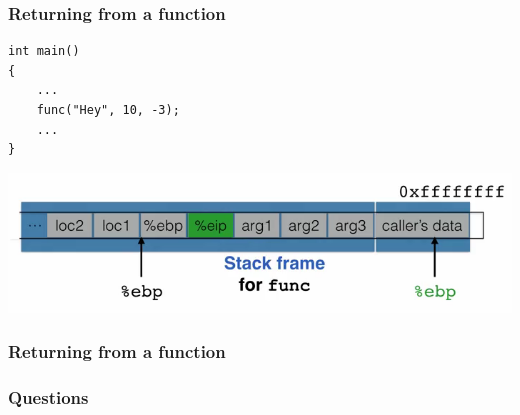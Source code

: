\documentclass[serif,mathserif]{beamer}
\begin{document}
\begin{frame}[fragile]
  \frametitle{Returning from a function}
\begin{lstlisting}
int main()
{
    ...
    func("Hey", 10, -3);
    ...
}
\end{lstlisting}
\begin{center}
\includegraphics[scale=0.35]{stackff4.png}
\end{center}

\end{frame}



\begin{frame}[fragile]
  \frametitle{Returning from a function}

\end{frame}

\begin{frame}
  \frametitle{Questions}
\end{frame}
\end{document}
